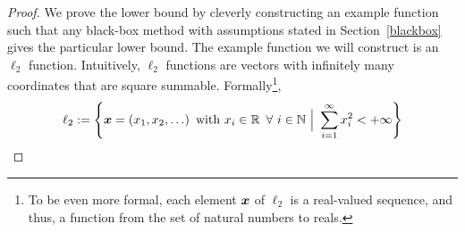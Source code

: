 \documentclass{article}
\begin{document}
\begin{proof}
We prove the lower bound by cleverly constructing an example function such that any black-box method with assumptions stated in Section~\ref{blackbox} gives the particular lower bound.
The example function we will construct is an $\ell_2$ function. 
Intuitively, $\ell_2$ functions are vectors with infinitely many coordinates that are square summable. 
Formally\footnote{To be even more formal, each element ${\bm{x}}$ of $\ell_2$ is a real-valued sequence, and thus, a function from the set of natural numbers to reals.}, 
	\[
	    \ell_2 
	    := 
	    \left\{ 
	        \vx = \left(
	            \evx_1, \evx_2, \ldots
	   \right)\ \text{with}\ \evx_i\in\mathbb{R}\ \forall\,i\in\mathbb{N}\ 
	   \Big\lvert\ 
	       \sum_{i=1}^{\infty} x_i^2 < +\infty 
	    \right\}
	\]
    

\end{proof}
\end{document}
